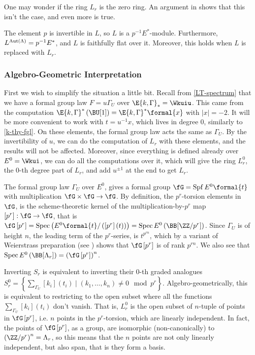 One may wonder if the ring $L_r$ is the zero ring.
An argument in \cite{HKR} shows that this isn't the case, and even more is true.

\begin{proposition}\label{Lr-fixed-points}
	The element $p$ is invertible in $L$, so $L$ is a $p^{-1} E^*$-module.
	Furthermore, $L^{\operatorname{Aut} \left(\Lambda\right)} = p^{-1} E^*$, and $L$ is faithfully flat over it.
	Moreover, this holds when $L$ is replaced with $L_r$.
\end{proposition}


\subsubsection{Algebro-Geometric Interpretation}\label{alg-geo-Lr}

First we wish to simplify the situation a little bit.
Recall from \cref{LT-spectrum} that we have a formal group law $F = u \Gamma_U$ over $\E{k, \Gamma}_* = \Wkuiu$.
This came from the computation $\E{k, \Gamma}^*\left(\BU[1]\right) = \E{k, \Gamma}^* \formal{x}$ with $\left|x\right| = -2$.
It will be more convenient to work with $t = u^{-1} x$, which lives in degree $0$, similarly to \cref{k-thy-fgl}.
On these elements, the formal group law acts the same as $\Gamma_U$.
By the invertibility of $u$, we can do the computation of $L_r$ with these elements, and the results will not be affected.
Moreover, since everything is defined already over $E^0 = \Wkui$, we can do all the computations over it, which will give the ring $L_r^0$, the $0$-th degree part of $L_r$, and add $u^{\pm 1}$ at the end to get $L_r$.

The formal group law $\Gamma_U$ over $E^0$, gives a formal group $\fG = \spf E^0\formal{t}$ with multiplication $\fG \times \fG \to \fG$.
By definition, the $p^r$-torsion elements in $\fG$, is the scheme-theoretic kernel of the multiplication-by-$p^r$ map $\left[p^r\right]: \fG \to \fG$, that is $\fG\left[p^r\right] = \spec\left(E^0\formal{t}/\left(\left[p^r\right]\left(t\right)\right)\right) = \spec E^0\left(\BB[\ZZ / p^r]\right)$.
Since $\Gamma_U$ is of height $n$, the leading term of the $p^r$-series, is $t^{p^{rn}}$, which by a variant of Weierstrass preparation (see \cite[5.1]{HKR}) shows that $\fG\left[p^r\right]$ is of rank $p^{rn}$.
We also see that $\spec E^0\left(\BB[\Lambda_r]\right) = \left(\fG\left[p^r\right]\right)^n$.

Inverting $S_r$ is equivalent to inverting their $0$-th graded analogues $S_r^0 = \left\{ \sum_{\Gamma_U} [k_i]\left(t_i\right) \mid \left(k_1, \dotsc, k_n\right) \neq 0 \mod p^r\right\}$.
Algebro-geometrically, this is equivalent to restricting to the open subset where all the functions $\sum_{\Gamma_U} [k_i]\left(t_i\right)$ don't vanish.
That is, $L_r^0$ is the open subset of $n$-tuple of points in $\fG\left[p^r\right]$, i.e. $n$ points in the $p^r$-torsion, which are linearly independent.
In fact, the points of $\fG\left[p^r\right]$, as a group, are isomorphic (non-canonically) to $\left(\ZZ/p^r\right)^n = \Lambda_r$, so this means that the $n$ points are not only linearly independent, but also span, that is they form a basis.

